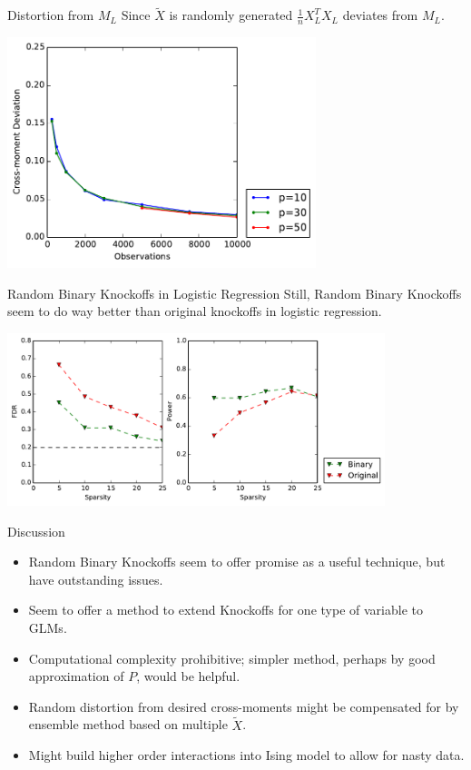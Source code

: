 \documentclass{beamer}
\begin{document}
\begin{frame}{Distortion from $M_L$}
    Since $\tilde X$ is randomly generated $\frac{1}{n}X_L^TX_L$ deviates from $M_L$.
    \begin{center}
        \includegraphics[width=9cm]{images/sigma_fit}
    \end{center}
\end{frame}

\begin{frame}{Random Binary Knockoffs in Logistic Regression}
    Still, Random Binary Knockoffs seem to do way better than original knockoffs in logistic regression.
    \begin{center}
        \includegraphics[width=11cm]{images/logit_FDR_power_50}
    \end{center}
\end{frame}

\begin{frame}{Discussion}
    \begin{itemize}
        \item Random Binary Knockoffs seem to offer promise as a useful technique, but have outstanding issues.
        \item Seem to offer a method to extend Knockoffs for one type of variable to GLMs.
        \item Computational complexity prohibitive; simpler method, perhaps by good approximation of $P$, would be helpful.
        \item Random distortion from desired cross-moments might be compensated for by ensemble method based on multiple $\tilde X$.
        \item Might build higher order interactions into Ising model to allow for nasty data.
    \end{itemize}
\end{frame}
\end{document}
